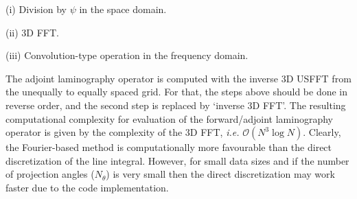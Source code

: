 \documentclass{article}
\begin{document}
\noindent (i) Division by $\psi$ in the space domain.

\noindent (ii) 3D FFT.

\noindent (iii) Convolution-type operation in the frequency domain.

The adjoint laminography operator is computed with the inverse 3D USFFT from the unequally to equally spaced grid. For that, the steps above should be done in reverse order, and the second step is replaced by ‘inverse 3D FFT’. The resulting computational complexity for evaluation of the forward/adjoint laminography operator is given by the complexity of the 3D FFT, \emph{i.e.} $\mathcal{O}(N^3 \log N)$. Clearly, the Fourier-based method is computationally more favourable than the direct discretization of the line integral. However, for small data sizes and if the number of projection angles ($N_\theta$) is very small then the direct discretization may work faster due to the code implementation.
\end{document}
